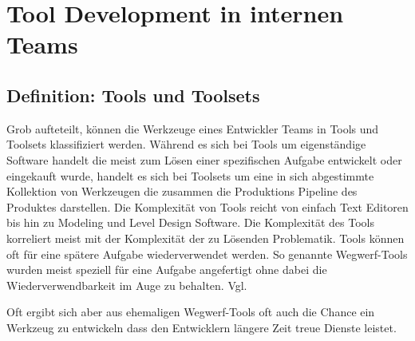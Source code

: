 \documentclass[pagesize, paper=a4, fontsize=12pt, titlepage=true, headings=small, headnosepline, abstractoff, liststotoc, nochapterprefix, plainheadsepline, twoside]{scrreprt}
\begin{document}
\chapter{Tool Development in internen Teams}

\section{Definition: Tools und Toolsets}
Grob aufteteilt, können die Werkzeuge eines Entwickler Teams in Tools und Toolsets klassifiziert werden. Während es sich bei Tools um eigenständige Software handelt die meist zum Lösen einer spezifischen Aufgabe entwickelt oder eingekauft wurde, handelt es sich bei Toolsets um eine in sich abgestimmte Kollektion von Werkzeugen die zusammen die Produktions Pipeline des Produktes darstellen. Die Komplexität von Tools reicht von einfach Text Editoren bis hin zu Modeling und Level Design Software. Die Komplexität des Tools korreliert meist mit der Komplexität der zu Lösenden Problematik.
Tools können oft für eine spätere Aufgabe wiederverwendet werden. So genannte Wegwerf-Tools wurden meist speziell für eine Aufgabe angefertigt ohne dabei die Wiederverwendbarkeit im Auge zu behalten. Vgl. \autocite[S. 3]{Wihlidal2006}

Oft ergibt sich aber aus ehemaligen Wegwerf-Tools oft auch die Chance ein Werkzeug zu entwickeln dass den Entwicklern längere Zeit treue Dienste leistet.


\end{document}
